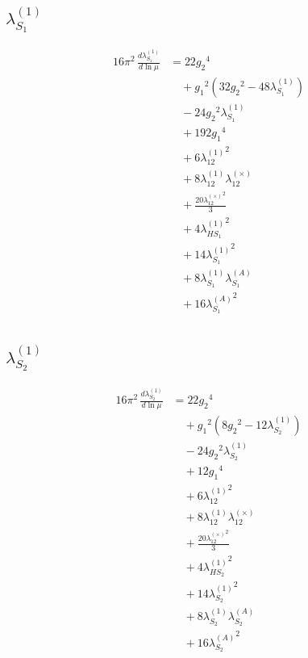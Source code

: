 \documentclass[10pt,a4paper]{article}
\begin{document}
\subsection*{$\lambda_{S_1}^{(1)}$}
\begin{align*}
16\pi^2\,\frac{d \lambda_{S_1}^{(1)}}{d\ln\mu} &=22 {g_2}^4 \\
&\quad +{g_1}^2 \left(32 {g_2}^2-48 {\lambda_{S_1}^{(1)}}\right) \\
&\quad -24 {g_2}^2 {\lambda_{S_1}^{(1)}} \\
&\quad +192 {g_1}^4 \\
&\quad +6 {\lambda_{12}^{(1)}}^2 \\
&\quad +8 {\lambda_{12}^{(1)}} {\lambda_{12}^{(\times)}} \\
&\quad +\frac{20 {\lambda_{12}^{(\times)}}^2}{3} \\
&\quad +4 {\lambda_{HS_1}^{(1)}}^2 \\
&\quad +14 {\lambda_{S_1}^{(1)}}^2 \\
&\quad +8 {\lambda_{S_1}^{(1)}} {\lambda_{S_1}^{(A)}} \\
&\quad +16 {\lambda_{S_1}^{(A)}}^2 \\
\end{align*}
\subsection*{$\lambda_{S_2}^{(1)}$}
\begin{align*}
16\pi^2\,\frac{d \lambda_{S_2}^{(1)}}{d\ln\mu} &=22 {g_2}^4 \\
&\quad +{g_1}^2 \left(8 {g_2}^2-12 {\lambda_{S_2}^{(1)}}\right) \\
&\quad -24 {g_2}^2 {\lambda_{S_2}^{(1)}} \\
&\quad +12 {g_1}^4 \\
&\quad +6 {\lambda_{12}^{(1)}}^2 \\
&\quad +8 {\lambda_{12}^{(1)}} {\lambda_{12}^{(\times)}} \\
&\quad +\frac{20 {\lambda_{12}^{(\times)}}^2}{3} \\
&\quad +4 {\lambda_{HS_2}^{(1)}}^2 \\
&\quad +14 {\lambda_{S_2}^{(1)}}^2 \\
&\quad +8 {\lambda_{S_2}^{(1)}} {\lambda_{S_2}^{(A)}} \\
&\quad +16 {\lambda_{S_2}^{(A)}}^2 \\
\end{align*}
\end{document}
